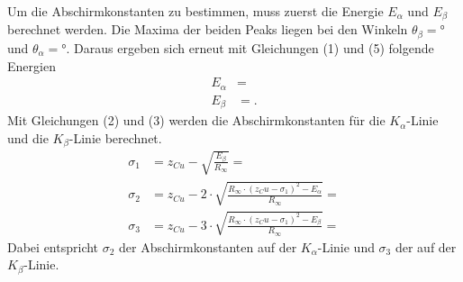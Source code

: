\noindent Um die Abschirmkonstanten zu bestimmen, muss zuerst die Energie $E_\alpha$ und $E_\beta$ berechnet werden. 
Die Maxima der beiden Peaks liegen bei den Winkeln $\theta_{\beta} = $° und $\theta_{\alpha} = $°.
Daraus ergeben sich erneut mit Gleichungen (1) und (5) folgende Energien
\begin{align*}
E_\alpha &=  \\
E_\beta &= .
\end{align*}
Mit Gleichungen (2) und (3) werden die Abschirmkonstanten für die $K_{\alpha}$-Linie und die $K_{\beta}$-Linie berechnet.
\begin{align*}
\sigma_1 &= z_{Cu} - \sqrt{\frac{E_\beta}{R_\infty}} = \\
\sigma_2 &= z_{Cu} - 2 \cdot \sqrt{\frac{R_\infty \cdot (z_Cu - \sigma_1)^2 - E_\alpha}{R_\infty}} = \\
\sigma_3 &= z_{Cu} - 3 \cdot \sqrt{\frac{R_\infty \cdot (z_Cu - \sigma_1)^2 - E_\beta}{R_\infty}} = 
\end{align*}
Dabei entspricht $\sigma_2$ der Abschirmkonstanten auf der $K_{\alpha}$-Linie und $\sigma_3$ der auf der $K_{\beta}$-Linie.
